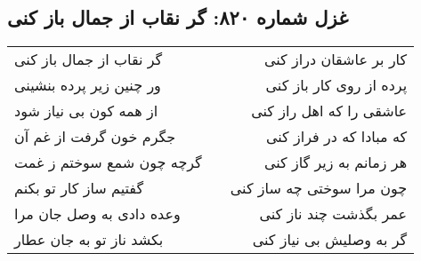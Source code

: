 \begin{center}
\section*{غزل شماره ۸۲۰: گر نقاب از جمال باز کنی}
\label{sec:820}
\begin{longtable}{l p{0.5cm} r}
گر نقاب از جمال باز کنی
&&
کار بر عاشقان دراز کنی
\\
ور چنین زیر پرده بنشینی
&&
پرده از روی کار باز کنی
\\
از همه کون بی نیاز شود
&&
عاشقی را که اهل راز کنی
\\
جگرم خون گرفت از غم آن
&&
که مبادا که در فراز کنی
\\
گرچه چون شمع سوختم ز غمت
&&
هر زمانم به زیر گاز کنی
\\
گفتیم ساز کار تو بکنم
&&
چون مرا سوختی چه ساز کنی
\\
وعده دادی به وصل جان مرا
&&
عمر بگذشت چند ناز کنی
\\
بکشد ناز تو به جان عطار
&&
گر به وصلیش بی نیاز کنی
\\
\end{longtable}
\end{center}

